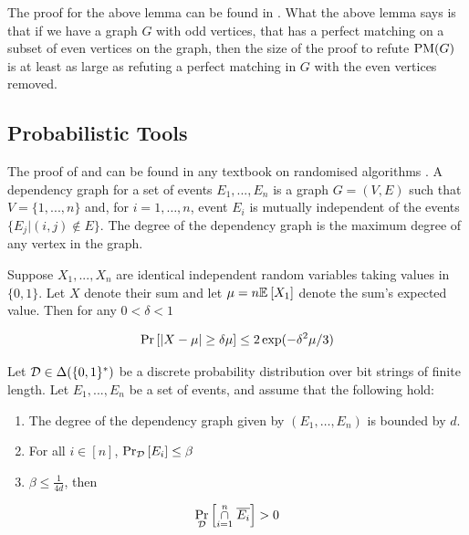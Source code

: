 \documentclass[11pt]{article}
\begin{document}
The proof for the above lemma can be found in \citep[Lemma 2.2]{Austrin_2022}.
What the above lemma says is that if we have a graph $G$ with odd vertices, that has a perfect matching on a subset of even vertices on the graph, then the size of the proof to refute $\text{PM}(G)$ is at least as large as refuting a perfect matching in $G$ with the even vertices removed.

\subsection{Probabilistic Tools}

The proof of  and 
can be found in any textbook on randomised algorithms \citep[See Chapter 1, Chapter 7]{mitzenmacher2017probability}.
A dependency graph for a set of events $E_1, . . . , E_n$ is a graph $G=(V, E)$ such that $V = \{1,.. . , n\}$ and,  for $i= 1,\dots, n$, event $E_i$ is mutually independent
of the events $\{E_j | (i, j) \notin E\}$. The degree of the dependency graph is the maximum degree of any vertex in the graph.


\begin{lemma}\label{lemma:mult-chernoff}
Suppose $X_1, ..., X_n$ are identical independent random variables taking values in $\{0, 1\}$. Let $X$ denote their sum and let $\mu = n\mathbb{E}_{}\left[X_1\right]$ denote the sum's expected value. Then for any $0 < \delta < 1$

\[ \Pr\left[|X - \mu| \geq \delta \mu \right] \leq 2\exp(-\delta^2\mu/3)\]

\end{lemma}




\begin{lemma}\label{lemma:lll}Let $\mathcal{D} \in \Delta(\{0,1\}^*)$ be a discrete probability distribution over bit strings of finite length.
  Let $E_1,...,E_n$ be a set of events, and assume that the following hold:
\begin{enumerate}
\item The degree of the dependency graph given by $(E_1, \dots, E_n)$ is bounded by $d$.

\item For all $i \in [n]$, $\Pr_{\mathcal{D}}\left[E_i \right] \leq \beta$

\item $\beta \leq \frac{1}{4d}$, then

\end{enumerate}

\[ \Pr_{\mathcal{D}}\left[\overset{n}{ \underset{i=1}{\cap}} \hspace{0.1cm}  \overline{E_i} \right] > 0\]


\end{lemma}
\end{document}
